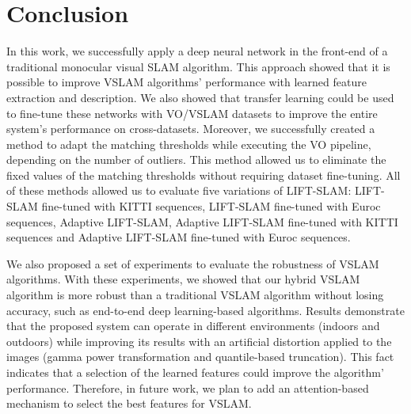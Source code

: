 \section{Conclusion}
\label{sec:conclusion}

In this work, we successfully apply a deep neural network in the front-end of a traditional monocular visual SLAM algorithm. This approach showed that it is possible to improve VSLAM algorithms' performance with learned feature extraction and description. We also showed that transfer learning could be used to fine-tune these networks with VO/VSLAM datasets to improve the entire system's performance on cross-datasets. Moreover, we successfully created a method to adapt the matching thresholds while executing the VO pipeline, depending on the number of outliers. This method allowed us to eliminate the fixed values of the matching thresholds without requiring dataset fine-tuning. All of these methods allowed us to evaluate five variations of LIFT-SLAM: LIFT-SLAM fine-tuned with KITTI sequences, LIFT-SLAM fine-tuned with Euroc sequences, Adaptive LIFT-SLAM, Adaptive LIFT-SLAM fine-tuned with KITTI sequences and Adaptive LIFT-SLAM fine-tuned with Euroc sequences. 

We also proposed a set of experiments to evaluate the robustness of VSLAM algorithms. With these experiments, we showed that our hybrid VSLAM algorithm is more robust than a traditional VSLAM algorithm without losing accuracy, such as end-to-end deep learning-based algorithms. Results demonstrate that the proposed system can operate in different environments (indoors and outdoors) while improving its results with an artificial distortion applied to the images (gamma power transformation and quantile-based truncation). This fact indicates that a selection of the learned features could improve the algorithm' performance. Therefore, in future work, we plan to add an attention-based mechanism to select the best features for VSLAM.